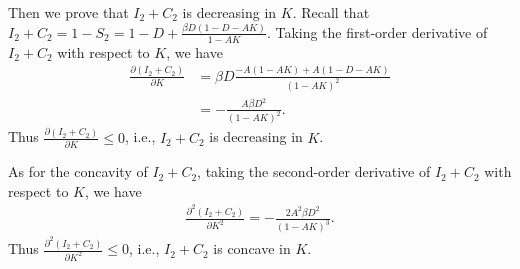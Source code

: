 \documentclass[nonblindrev, copyedit]{informs3a}
\begin{document}
Then we prove that $I_2+C_2$ is decreasing in $K$. Recall that $I_2+C_2=1-S_2=1-D+\frac{\beta D(1-D-AK)}{1-AK}$. Taking the first-order derivative of $I_2+C_2$ with respect to $K$, we have
\begin{align*}
   \frac{\partial (I_2+C_2)}{\partial K}&=\beta D\frac{-A(1-AK)+A(1-D-AK)}{(1-AK)^2}\\
   &=-\frac{A\beta D^2}{(1-AK)^2}.
\end{align*}
Thus $\frac{\partial (I_2+C_2)}{\partial K}\le 0$,  i.e.,  $I_2+C_2$ is decreasing in $K$.

As for the concavity of $I_2+C_2$, taking the second-order derivative of $I_2+C_2$ with respect to $K$, we have
\begin{align*}
   \frac{\partial^2 (I_2+C_2)}{\partial K^2}=-\frac{2A^2\beta D^2}{(1-AK)^3}.
\end{align*}
Thus $\frac{\partial^2 (I_2+C_2)}{\partial K^2}\le 0$, i.e., $I_2+C_2$ is concave in $K$.\Halmos
\endproof
\end{document}
